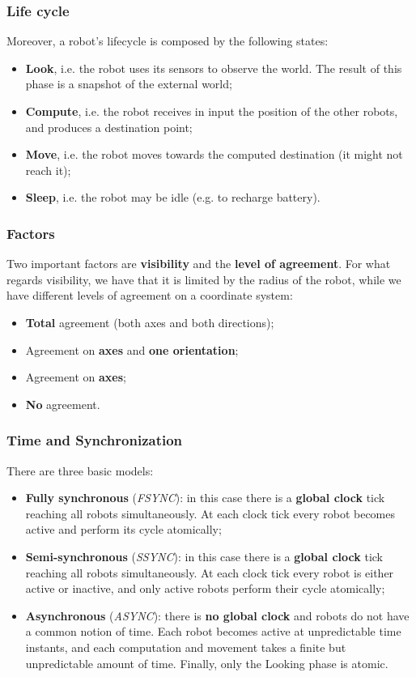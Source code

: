\subsubsection{Life cycle}
Moreover, a robot's lifecycle is composed by the following states:
\begin{itemize}
    \item \textbf{Look}, i.e. the robot uses its sensors to observe the world. The result of this phase is a snapshot of the external world;
    \item \textbf{Compute}, i.e. the robot receives in input the position of the other robots, and produces a destination point;
    \item \textbf{Move}, i.e. the robot moves towards the computed destination (it might not reach it);
    \item \textbf{Sleep}, i.e. the robot may be idle (e.g. to recharge battery).
\end{itemize}

\subsubsection{Factors}
Two important factors are \textbf{visibility} and the \textbf{level of agreement}. For what regards visibility, we have that it is limited by the radius of the robot, while we have different levels of agreement on a coordinate system:
\begin{itemize}
    \item \textbf{Total} agreement (both axes and both directions);
    \item Agreement on \textbf{axes} and \textbf{one orientation};
    \item Agreement on \textbf{axes};
    \item \textbf{No} agreement.
\end{itemize}

\subsubsection{Time and Synchronization}
There are three basic models:
\begin{itemize}
    \item \textbf{Fully synchronous} (\textit{FSYNC}): in this case there is a \textbf{global clock} tick reaching all robots simultaneously. At each clock tick every robot becomes active and perform its cycle atomically;
    \item \textbf{Semi-synchronous} (\textit{SSYNC}): in this case there is a \textbf{global clock} tick reaching all robots simultaneously. At each clock tick every robot is either active or inactive, and only active robots perform their cycle atomically;
    \item \textbf{Asynchronous} (\textit{ASYNC}): there is \textbf{no global clock} and robots do not have a common notion of time. Each robot becomes active at unpredictable time instants, and each computation and movement takes a finite but unpredictable amount of time. Finally, only the Looking phase is atomic.
\end{itemize}

